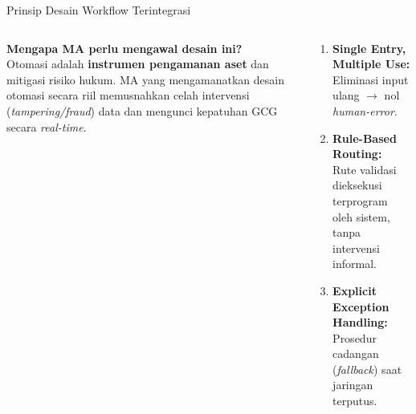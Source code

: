 \documentclass[aspectratio=169,11pt]{beamer}
\begin{document}

\begin{frame}{Prinsip Desain Workflow Terintegrasi}
    \vspace{0.2cm}
    \begin{columns}[T]
        \begin{premiumbox}
            \scriptsize
            \textbf{Mengapa MA perlu mengawal desain ini?}\\[0.1cm]
            Otomasi adalah \textbf{instrumen pengamanan aset} dan mitigasi risiko hukum. MA yang mengamanatkan desain otomasi secara riil memusnahkan celah intervensi (\textit{tampering/fraud}) data dan mengunci kepatuhan GCG secara \textit{real-time}.
        \end{premiumbox}
        
        \begin{orangebox}
            \scriptsize
            \begin{enumerate}
                \item \textbf{Single Entry, Multiple Use:}\\Eliminasi input ulang $\rightarrow$ nol \textit{human-error}.
                \item \textbf{Rule-Based Routing:}\\Rute validasi dieksekusi terprogram oleh sistem, tanpa intervensi informal.
                \item \textbf{Explicit Exception Handling:}\\Prosedur cadangan (\textit{fallback}) saat jaringan terputus.
            \end{enumerate}
        \end{orangebox}
    \end{columns}
\end{frame}
\end{document}
